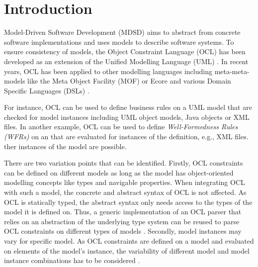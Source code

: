 \section{Introduction}

	Model-Driven Software Development (MDSD) aims to abstract from concrete 
	software implementations and uses models to describe 
	software systems. To ensure consistency of models, the Object Constraint Language 
	(OCL) \cite{spec:OCL2-2} has been developed as an extension of the Unified 
	Modelling Language (UML) \cite{spec:UML2-2}. In recent years, OCL has been 
	applied to other modelling languages including meta-meta-models 
	like the Meta Object Facility (MOF) or Ecore and various 
	Domain Specific Languages (DSLs) \cite{oclExample:DSL} . 

	For instance, OCL can be used to define business rules on a UML model 
	that are checked for model instances including UML object models,  
	Java objects or XML files. In another example, OCL can be used to define \textit{Well-Formedness 
	Rules (WFRs)} on an  that are evaluated for instances 
	of the definition, e.g., XML files. ther instances of the  model are possible.
	
	There are two variation points that can be identified. Firstly, OCL constraints can 
	be defined on different models as long as the model has object-oriented 
	modelling concepts like types and navigable properties. When integrating OCL with 
	such a model, the concrete and abstract syntax of OCL is not affected. 
	As OCL is statically typed, the abstract syntax only needs access to the types of the 
	model it is defined on. Thus, a generic implementation of an OCL parser
	that relies on an abstraction of the  underlying type system  can be
	reused to parse OCL constraints on different types of models \cite{braeuerOCL07}.
	Secondly, model instances may vary for  specific  model. As OCL constraints 
	are defined on a model and evaluated on elements of the model's instance, the variability 
	of different model and model instance combinations has to be considered .
	
